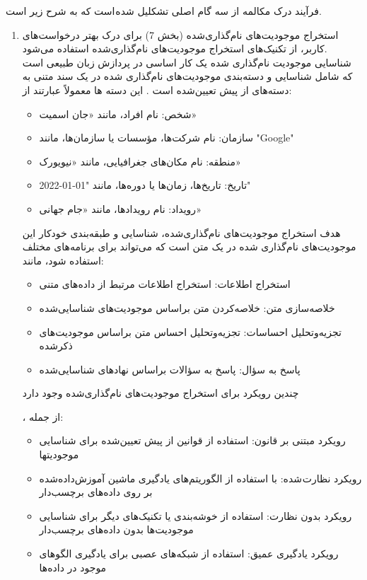 فرآیند درک مکالمه از سه گام اصلی تشکلیل شده است که به شرح زیر است.
\begin{enumerate}
\item

استخراج موجودیت‌های نام‌گذاری‌شده%
 (بخش 7) برای درک بهتر درخواست‌های کاربر، از تکنیک‌های استخراج موجودیت‌های نام‌گذاری‌شده استفاده می‌شود.\\
شناسایی موجودیت نام‌گذاری شده یک کار اساسی در پردازش زبان طبیعی است که شامل شناسایی و دسته‌بندی موجودیت‌های نام‌گذاری شده در یک سند متنی به دسته‌های از پیش تعیین‌شده است
\cite{singh2020movie}
.
این دسته ها معمولاً عبارتند از:
\begin{itemize}
\item
شخص: نام افراد، مانند «جان اسمیت»
\item
سازمان: نام شرکت‌ها، مؤسسات یا سازمان‌ها، مانند "Google"
\item
منطقه: نام مکان‌های جغرافیایی، مانند «نیویورک»
\item
تاریخ: تاریخ‌ها، زمان‌ها یا دوره‌ها، مانند "01-01-2022"
\item
رویداد: نام رویدادها، مانند «جام جهانی»
\end{itemize}

هدف استخراج موجودیت‌های نام‌گذاری‌شده، شناسایی و طبقه‌بندی خودکار این موجودیت‌های نام‌گذاری شده در یک متن است که می‌تواند برای برنامه‌های مختلف استفاده شود، مانند:
\begin{itemize}
\item
استخراج اطلاعات: استخراج اطلاعات مرتبط از داده‌های متنی
\item
خلاصه‌سازی متن: خلاصه‌کردن متن براساس موجودیت‌های شناسایی‌شده
\item
تجزیه‌وتحلیل احساسات: تجزیه‌وتحلیل احساس متن براساس موجودیت‌های ذکرشده
\item
پاسخ به سؤال: پاسخ به سؤالات براساس نهادهای شناسایی‌شده
\end{itemize}


چندین رویکرد برای استخراج موجودیت‌های نام‌گذاری‌شده وجود دارد %
\cite{corecco2024evolution}

، از جمله:
\begin{itemize}
\item
رویکرد مبتنی بر قانون: استفاده از قوانین از پیش تعیین‌شده برای شناسایی موجودیتها
\item
رویکرد نظارت شده: با استفاده از الگوریتم‌های یادگیری ماشین آموزش‌داده‌شده بر روی داده‌های برچسب‌دار
\item
رویکرد بدون نظارت: استفاده از خوشه‌بندی یا تکنیک‌های دیگر برای شناسایی موجودیت‌ها بدون داده‌های برچسب‌دار
\item
رویکرد یادگیری عمیق: استفاده از شبکه‌های عصبی برای یادگیری الگوهای موجود در داده‌ها%
\cite{fan2024recommender}


\end{itemize}
\end{enumerate}
